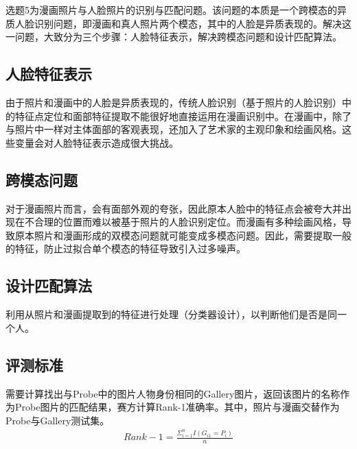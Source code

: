 选题5为漫画照片与人脸照片的识别与匹配问题。该问题的本质是一个跨模态的异质人脸识别问题，即漫画和真人照片两个模态，其中的人脸是异质表现的。解决这一问题，大致分为三个步骤：人脸特征表示，解决跨模态问题和设计匹配算法。

\subsection{人脸特征表示}
由于照片和漫画中的人脸是异质表现的，传统人脸识别（基于照片的人脸识别）中的特征点定位和面部特征提取不能很好地直接运用在漫画识别中。在漫画中，除了与照片中一样对主体面部的客观表现，还加入了艺术家的主观印象和绘画风格。这些变量会对人脸特征表示造成很大挑战。
\subsection{跨模态问题}
对于漫画照片而言，会有面部外观的夸张，因此原本人脸中的特征点会被夸大并出现在不合理的位置而难以被基于照片的人脸识别定位。而漫画有多种绘画风格，导致原本照片和漫画形成的双模态问题就可能变成多模态问题。因此，需要提取一般的特征，防止过拟合单个模态的特征导致引入过多噪声。
\subsection{设计匹配算法}
利用从照片和漫画提取到的特征进行处理（分类器设计），以判断他们是否是同一个人。 
\subsection{评测标准}
需要计算找出与Probe中的图片人物身份相同的Gallery图片，返回该图片的名称作为Probe图片的匹配结果，赛方计算Rank-1准确率。其中，照片与漫画交替作为Probe与Gallery测试集。\begin{align*}
    	 Rank-1=\frac{\Sigma^{n}_{i=1}I(G_{i1}=P_i)}{n}
\end{align*}

